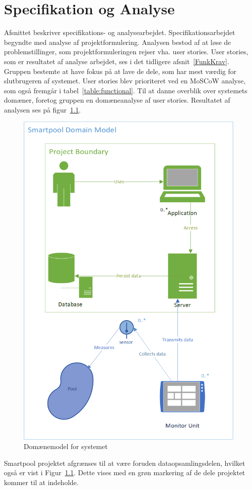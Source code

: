 \chapter{Specifikation og Analyse}\label{SpecOgAnalyse}
Afsnittet beskriver specifikations- og analysearbejdet. Specifikationsarbejdet begyndte med analyse af projektformulering. Analysen bestod af at løse de problemstillinger, som projektformuleringen rejser vha. user stories. User stories, som er resultatet af analyse arbejdet, ses i det tidligere afsnit~\ref{FunkKrav}. Gruppen bestemte at have fokus på at lave de dele, som har mest værdig for slutbrugeren af systemet. User stories blev prioriteret ved en MoSCoW analyse, som også fremgår i tabel~\ref{table:functional}. Til at danne overblik over systemets domæner, foretog gruppen en domæneanalyse af user stories. Resultatet af analysen ses på figur~\ref{fig:domainmodelboundary}.

\begin{figure}
	\centering
	\includegraphics[width=0.65\linewidth]{figs/ProjectBoundary}
	\caption{Domænemodel for systemet}
	\label{fig:domainmodelboundary}
\end{figure}

Smartpool projektet afgrænses til at være foruden dataopsamlingsdelen, hvilket også er vist i Figur~\ref{fig:domainmodelboundary}. Dette vises med en grøn markering af de dele projektet kommer til at indeholde.


